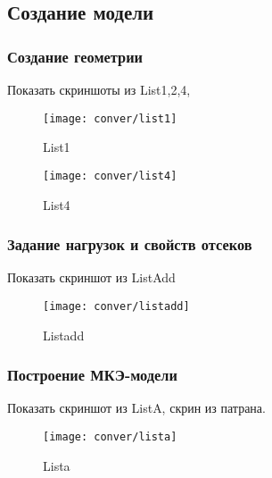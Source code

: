 \subsection{Создание модели}
\label{sec:creationOfOneModel}
\subsubsection{Создание геометрии}
Показать скриншоты из List1,2,4,

\begin{figure}[H]
\centering
\texttt{[image: conver/list1]}
\caption{List1}
\label{fig:conver_list1}
\end{figure}

\begin{figure}[H]
\centering
\texttt{[image: conver/list4]}
\caption{List4}
\label{fig:conver_list4}
\end{figure}

\subsubsection{Задание нагрузок и свойств отсеков}
Показать скриншот из ListAdd

\begin{figure}[H]
\centering
\texttt{[image: conver/listadd]}
\caption{Listadd}
\label{fig:conver_listadd}
\end{figure}

\subsubsection{Построение МКЭ-модели}
Показать скриншот из ListA, скрин из патрана. 

\begin{figure}[H]
\centering
\texttt{[image: conver/lista]}
\caption{Lista}
\label{fig:conver_lista}
\end{figure}
